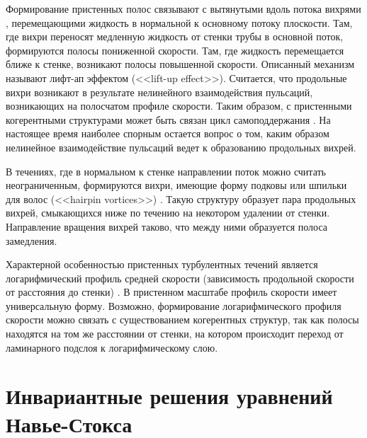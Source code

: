 Формирование пристенных полос связывают с вытянутыми вдоль потока вихрями \cite{Blackwelder1979, Jeong1997}, перемещающими жидкость в нормальной к основному потоку плоскости. Там, где вихри переносят медленную жидкость от стенки трубы в основной поток, формируются полосы пониженной скорости. Там, где жидкость перемещается ближе к стенке, возникают полосы повышенной скорости. Описанный механизм называют лифт-ап эффектом (<<lift-up effect>>). Считается, что продольные вихри возникают в результате нелинейного взаимодействия пульсаций, возникающих на полосчатом профиле скорости. Таким образом, с пристенными когерентными структурами может быть связан цикл самоподдержания \cite{Hamilton1995, Waleffe1997, Schoppa2002, Kawahara2003}. На настоящее время наиболее спорным остается вопрос о том, каким образом нелинейное взаимодействие пульсаций ведет к образованию продольных вихрей.

В течениях, где в нормальном к стенке направлении поток можно считать неограниченным, формируются вихри, имеющие форму подковы или шпильки для волос (<<hairpin vortices>>) \cite{Head1981, Robinson1991, Adrian2000, Adrian2007}. Такую структуру образует пара продольных вихрей, смыкающихся ниже по течению на некотором удалении от стенки. Направление вращения вихрей таково, что между ними образуется полоса замедления.  

Характерной особенностью пристенных турбулентных течений является логарифмический профиль средней скорости (зависимость продольной скорости от расстояния до стенки) \cite{Kim1987}. В пристенном масштабе профиль скорости имеет универсальную форму. Возможно, формирование логарифмического профиля скорости можно связать с существованием когерентных структур, так как полосы находятся на том же расстоянии от стенки, на котором происходит переход от ламинарного подслоя к логарифмическому слою.


\section{Инвариантные решения уравнений Навье-Стокса}

